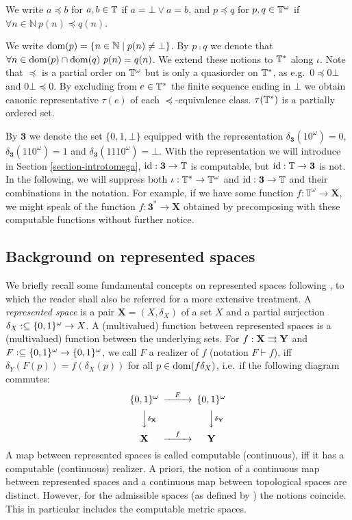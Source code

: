 \documentclass{eptcs-modified}
\begin{document}
We write $a \preceq b$ for $a, b \in \mathbb{T}$ if $a = \bot \lor a = b$, and
$p \preceq q$ for $p, q \in \mathbb{T}^\omega$  if
$\forall n \in \mathbb{N} \ p(n) \preceq q(n)$.

 We write $\operatorname{dom}(p) = \{n \in \mathbb{N} \mid p(n) \neq \bot\}$. By $p \comp q$ we denote that $\forall n \in \operatorname{dom}(p) \cap \operatorname{dom}(q) \ p(n) = q(n)$. We extend these notions to $\mathbb{T}^*$ along $\iota$. Note that $\preceq$ is a partial order on $\mathbb{T}^\omega$ but is only a quasiorder on $\mathbb{T}^*$, as e.g.~$0 \preceq 0\bot$ and $0\bot \preceq 0$. By excluding from $e \in \mathbb{T}^*$ the finite sequence ending in $\bot$ we obtain canonic representative $\tau(e)$ of each $\preceq$-equivalence class.  $\tau(\mathbb{T}^*)$ is a partially ordered set.

By $\mathbf{3}$ we denote the set $\{0,1,\bot\}$ equipped with the representation $\delta_\mathbf{3}(10^\omega) = 0$, $\delta_\mathbf{3}(110^\omega) = 1$ and $\delta_\mathbf{3}(1110^\omega) = \bot$.
With the representation we will introduce in Section \ref{section-introtomega},
$\textnormal{id} : \mathbf{3} \to \mathbb{T}$ is computable, but $\textnormal{id} : \mathbb{T} \to \mathbf{3}$ is not. In the following, we will suppress both $\iota : \mathbb{T}^* \to \mathbb{T}^\omega$ and $\textnormal{id} : \mathbf{3} \to \mathbb{T}$ and their combinations in the notation. For example, if we have some function $f : \mathbb{T}^\omega \to \mathbf{X}$, we might speak of the function $f : \mathbf{3}^* \to \mathbf{X}$ obtained by precomposing with these computable functions without further notice.

\subsection{Background on represented spaces}
We briefly recall some fundamental concepts on represented spaces following \cite{pauly-synthetic}, to which the reader shall also be referred for a more extensive treatment. A \emph{represented space} is a pair $\mathbf{X} = (X, \delta_X)$ of a set $X$ and a partial surjection $\delta_X : \subseteq {\{0,1\}^\omega} \to X$. A (multivalued) function between represented spaces is a (multivalued) function between the underlying sets. For $f : \mathbf{X} \rightrightarrows \mathbf{Y}$ and $F : \subseteq {\{0,1\}^\omega} \to {\{0,1\}^\omega}$, we call $F$ a realizer of $f$ (notation $F \vdash f$), iff $\delta_Y(F(p)) = f(\delta_X(p))$ for all $p \in \operatorname{dom}(f\delta_X)$, i.e.~if the following diagram commutes:
 $$\begin{CD}
\Cantor @>F>> \Cantor\\
@VV\delta_\mathbf{X}V @VV\delta_\mathbf{Y}V\\
\mathbf{X} @>f>> \mathbf{Y}
\end{CD}$$
A map between represented spaces is called computable (continuous), iff it has a computable (continuous) realizer. A priori, the notion of a continuous map between represented spaces and a continuous map between topological spaces are distinct. However, for the admissible spaces (as defined by  \cite{schroder,schroder5}) the notions coincide. This in particular includes the computable metric spaces.
\end{document}

